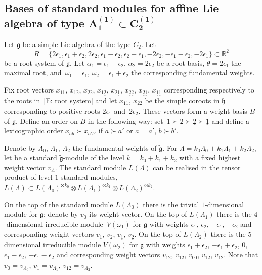 \documentclass[pdftex]{sigma}
\newcommand{\g}
{{\mathfrak g}}
\newcommand{\gt}
{\tilde{{\mathfrak g}}}
\numberwithin{equation}{section}
\begin{document}
\subsection[Bases of standard modules for affine Lie algebra of type A\_1\^(1)subset C\_2\^(1)]{Bases of standard modules for affine Lie algebra of type $\boldsymbol{ A_1^{(1)}\subset C_2^{(1)}}$}

Let $\g$ be a simple Lie algebra of the type $C_2$. Let
\begin{equation} \label{E: root system}
	R=\{2\epsilon_1, \epsilon_1 + \epsilon_2, 2\epsilon_2, \epsilon_1 - \epsilon_2, \epsilon_2 - \epsilon_1, - 2 \epsilon_2, -\epsilon_1 - \epsilon_2,-2\epsilon_1\} \subset \mathbb R^2
\end{equation}
be a root system of $\g$. Let $\alpha_1=\epsilon_1 - \epsilon_2$, $\alpha_2=2 \epsilon_2$ be a root basis, $\theta=2\epsilon_1$ the maximal root, and~${\omega_1=\epsilon_1}$, $\omega_2=\epsilon_1+\epsilon_2$ the corresponding fundamental weights.

Fix root vectors
$x_{11}$, $x_{12}$, $x_{22}$, $x_{1 \underline{2}}$, $x_{2\underline{1}}$, $x_{\underline{2}\underline{2}}$, $x_{\underline{2}\underline{1}}$, $x_{\underline{1}\underline{1}}$
corresponding respectively to the roots in~\eqref{E: root system}
and let $x_{1\underline{1}}$, $x_{2 \underline{2}}$
be the simple coroots in $\mathfrak h$ corresponding to positive roots $2\epsilon_1$ and~$2\epsilon_2$.
These vectors form a weight basis $B$ of ${\mathfrak g}$. Define an order on $B$ in the following way: set~${1\succ 2 \succ \underline{2} \succ \underline {1}}$
and define a lexicographic order
$x_{ab}\succ x_{a'b'}$ if $a\succ a'$ or $a=a'$, $b\succ b'$.

Denote by $\Lambda_0$, $\Lambda_1$, $\Lambda_2$ the fundamental weights of $\gt$. For
$\Lambda=k_0 \Lambda_0+k_1 \Lambda_1+k_2 \Lambda_2$, let  be a standard $\tilde{\mathfrak g}$-module of the level $k=k_0+k_1+k_2$ with a fixed highest weight vector $v_\Lambda$. The standard module $L(\Lambda)$ can be realised in the tensor product of level $1$ standard modules,
$L(\Lambda)\subset L(\Lambda_0)^{\otimes k_0}\otimes L(\Lambda_1)^{\otimes k_1} \otimes L(\Lambda_2)^{\otimes k_2}$.

On the top of the standard module $L(\Lambda_0)$ there is the trivial $1$-dimensional module for $\g$; denote by $v_0$ its weight vector. On the top of $L(\Lambda_1)$ there is the $4$-dimensional irreducible module~$V(\omega_1)$ for $\g$ with weights $\epsilon_1$, $\epsilon_2$, $-\epsilon_1$, $-\epsilon_2$ and corresponding weight vectors $v_1$, $v_2$, $v_{\underline{1}}$, $v_{\underline{2}}$. On the top of $L(\Lambda_2)$ there is the $5$-dimensional irreducible module $V(\omega_2)$ for $\g$ with weights $\epsilon_1+\epsilon_2$, $-\epsilon_1+\epsilon_2$, $0$, $\epsilon_1-\epsilon_2$, $-\epsilon_1-\epsilon_2$ and corresponding weight vectors $v_{12}$, $v_{\underline{1}2}$, $v_{00}$, $v_{1 \underline{2}}$, $v_{\underline{1}\underline{2}}$. Note that $v_0=v_{\Lambda_0}$, $v_1=v_{\Lambda_1}$, $v_{12}=v_{\Lambda_2}$.
\end{document}
